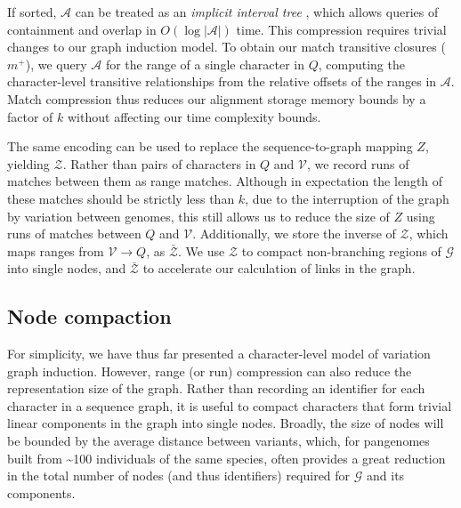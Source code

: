 \documentclass{bioinfo}
\theoremstyle{definition}
\begin{document}
If sorted, $\mathcal{A}$ can be treated as an \textit{implicit interval tree} \citep{Li_bedtk_2020}, which allows queries of containment and overlap in $O(\log |\mathcal{A}|)$ time.
This compression requires trivial changes to our graph induction model.
To obtain our match transitive closures ($m^+$), we query $\mathcal{A}$ for the range of a single character in $Q$, computing the character-level transitive relationships from the relative offsets of the ranges in $\mathcal{A}$.
Match compression thus reduces our alignment storage memory bounds by a factor of $k$ without affecting our time complexity bounds.

The same encoding can be used to replace the sequence-to-graph mapping $Z$, yielding $\mathcal{Z}$.
Rather than pairs of characters in $Q$ and $\mathcal{V}$, we record runs of matches between them as range matches.
Although in expectation the length of these matches should be strictly less than $k$, due to the interruption of the graph by variation between genomes, this still allows us to reduce the size of $Z$ using runs of matches between $Q$ and $\mathcal{V}$.
Additionally, we store the inverse of $\mathcal{Z}$, which maps ranges from $\mathcal{V} \to Q$, as $\bar{\mathcal{Z}}$.
We use $\mathcal{Z}$ to compact non-branching regions of $\mathcal{G}$ into single nodes, and $\bar{\mathcal{Z}}$ to accelerate our calculation of links in the graph.






\subsection{Node compaction}

For simplicity, we have thus far presented a character-level model of variation graph induction.
However, range (or run) compression can also reduce the representation size of the graph.
Rather than recording an identifier for each character in a sequence graph, it is useful to compact characters that form trivial linear components in the graph into single nodes.
Broadly, the size of nodes will be bounded by the average distance between variants, which, for pangenomes built from \textasciitilde100 individuals of the same species, often provides a great reduction in the total number of nodes (and thus identifiers) required for $\mathcal{G}$ and its components.
\end{document}
